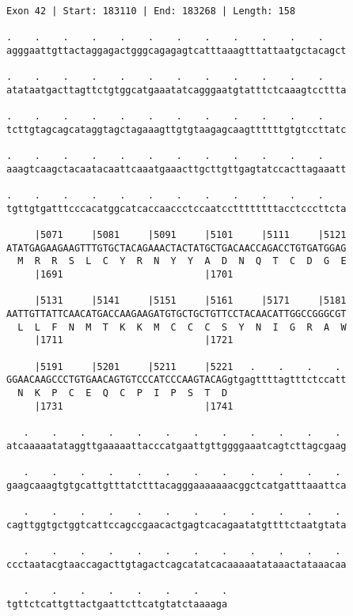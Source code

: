 \documentclass{article}
\begin{document}
\begin{Verbatim}
Exon 42 | Start: 183110 | End: 183268 | Length: 158
 
.    .    .    .    .    .    .    .    .    .    .    .    
agggaattgttactaggagactgggcagagagtcatttaaagtttattaatgctacagct
  
.    .    .    .    .    .    .    .    .    .    .    .    
atataatgacttagttctgtggcatgaaatatcagggaatgtatttctcaaagtccttta
  
.    .    .    .    .    .    .    .    .    .    .    .    
tcttgtagcagcataggtagctagaaagttgtgtaagagcaagttttttgtgtccttatc
  
.    .    .    .    .    .    .    .    .    .    .    .    
aaagtcaagctacaatacaattcaaatgaaacttgcttgttgagtatccacttagaaatt
  
.    .    .    .    .    .    .    .    .    .    .    .    
tgttgtgatttcccacatggcatcaccaaccctccaatccttttttttacctcccttcta
  
     |5071     |5081     |5091     |5101     |5111     |5121
ATATGAGAAGAAGTTTGTGCTACAGAAACTACTATGCTGACAACCAGACCTGTGATGGAG
  M  R  R  S  L  C  Y  R  N  Y  Y  A  D  N  Q  T  C  D  G  E
     |1691                         |1701                    
  
     |5131     |5141     |5151     |5161     |5171     |5181
AATTGTTATTCAACATGACCAAGAAGATGTGCTGCTGTTCCTACAACATTGGCCGGGCGT
  L  L  F  N  M  T  K  K  M  C  C  C  S  Y  N  I  G  R  A  W
     |1711                         |1721                    
  
     |5191     |5201     |5211     |5221   .    .    .    . 
GGAACAAGCCCTGTGAACAGTGTCCCATCCCAAGTACAGgtgagttttagtttctccatt
  N  K  P  C  E  Q  C  P  I  P  S  T  D                     
     |1731                         |1741                    
  
   .    .    .    .    .    .    .    .    .    .    .    . 
atcaaaaatataggttgaaaaattacccatgaattgttggggaaatcagtcttagcgaag
  
   .    .    .    .    .    .    .    .    .    .    .    . 
gaagcaaagtgtgcattgtttatctttacagggaaaaaaacggctcatgatttaaattca
  
   .    .    .    .    .    .    .    .    .    .    .    . 
cagttggtgctggtcattccagccgaacactgagtcacagaatatgttttctaatgtata
  
   .    .    .    .    .    .    .    .    .    .    .    . 
ccctaatacgtaaccagacttgtagactcagcatatcacaaaaatataaactataaacaa
  
   .    .    .    .    .    .    .    .
tgttctcattgttactgaattcttcatgtatctaaaaga
\end{Verbatim}
\end{document}
